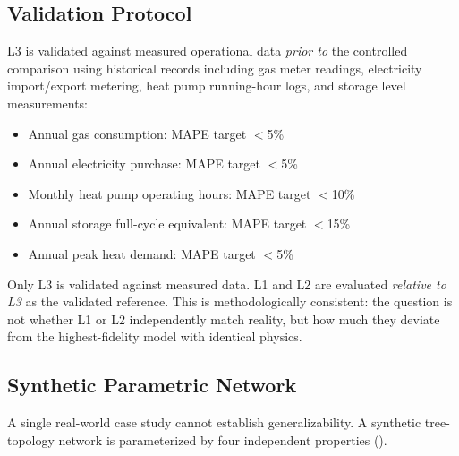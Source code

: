 \documentclass[review,3p]{elsarticle}
\begin{document}
\subsection{Validation Protocol}
\label{sec:case_validation}

L3 is validated against measured operational data \emph{prior to}
the controlled comparison using historical records including gas meter
readings, electricity import/export metering, heat pump running-hour
logs, and storage level measurements:

\begin{itemize}
    \item Annual gas consumption: MAPE target $<$5\%
    \item Annual electricity purchase: MAPE target $<$5\%
    \item Monthly heat pump operating hours: MAPE target $<$10\%
    \item Annual storage full-cycle equivalent: MAPE target $<$15\%
    \item Annual peak heat demand: MAPE target $<$5\%
\end{itemize}

Only L3 is validated against measured data. L1 and L2 are evaluated
\emph{relative to L3} as the validated reference. This is
methodologically consistent: the question is not whether L1 or L2
independently match reality, but how much they deviate from the
highest-fidelity model with identical physics.

\subsection{Synthetic Parametric Network}
\label{sec:case_synthetic}

A single real-world case study cannot establish generalizability. A
synthetic tree-topology network is parameterized by four independent
properties ().
\end{document}
